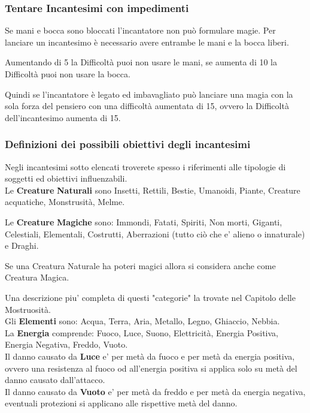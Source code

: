 \begin{multicols}{2}
\subsubsection{Tentare Incantesimi con impedimenti} 

Se mani e bocca sono bloccati l'incantatore non può formulare magie. Per lanciare un incantesimo è necessario avere entrambe le mani e la bocca liberi.

Aumentando di 5 la Difficoltà puoi non usare le mani, se aumenta di 10 la Difficoltà puoi non usare la bocca.

Quindi se l'incantatore è legato ed imbavagliato può lanciare una magia con la sola forza del pensiero con una difficoltà aumentata di 15, ovvero la Difficoltà dell'incantesimo aumenta di 15.


\subsubsection{Definizioni dei possibili obiettivi degli incantesimi}

Negli incantesimi sotto elencati troverete spesso i riferimenti alle tipologie di soggetti ed obiettivi influenzabili.\\

Le \textbf{Creature} \textbf{Naturali} sono Insetti, Rettili, Bestie, Umanoidi, Piante, Creature acquatiche, Monstrusità, Melme.

Le \textbf{Creature} \textbf{Magiche} sono: Immondi, Fatati, Spiriti, Non morti, Giganti, Celestiali, Elementali, Costrutti, Aberrazioni (tutto ciò che e' alieno o innaturale) e Draghi.

Se una Creatura Naturale ha poteri magici allora si considera anche come Creatura Magica.

Una descrizione piu' completa di questi "categorie" la trovate nel Capitolo delle Mostruosità.\\

Gli \textbf{Elementi} sono: Acqua, Terra, Aria, Metallo, Legno, Ghiaccio, Nebbia.\\
La \textbf{Energia} comprende: Fuoco, Luce, Suono, Elettricità, Energia Positiva, Energia Negativa, Freddo, Vuoto.\\
Il danno causato da \textbf{Luce} e' per metà da fuoco e per metà da energia positiva, ovvero una resistenza al fuoco od all'energia positiva si applica solo su metà del danno causato dall'attacco.\\
Il danno causato da \textbf{Vuoto} e' per metà da freddo e per metà da energia negativa, eventuali protezioni si applicano alle rispettive metà del danno.\\

\end{multicols}

